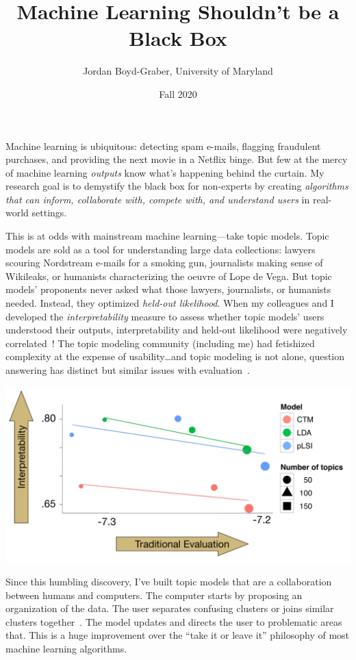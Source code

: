 \documentclass[11pt]{amsart}
\begin{document}
 \title{Machine Learning Shouldn't be a Black Box}

 \author{Jordan Boyd-Graber, University of Maryland}


\date{Fall 2020}

\maketitle

Machine learning is ubiquitous: detecting spam e-mails, flagging fraudulent
purchases, and providing the next movie in a Netflix binge.  But few at
the mercy of machine learning \emph{outputs} know what's happening behind the
curtain.  My research goal is to demystify the black box for non-experts by
creating \emph{algorithms that can inform, collaborate with, compete with, and
  understand users} in real-world settings.

This is at odds with mainstream machine learning---take topic models.  Topic
models are sold as a tool for understanding large data collections: lawyers
scouring Nordstream e-mails for a smoking gun, journalists making sense of Wikileaks,
or humanists characterizing the oeuvre of Lope de Vega.  But topic models'
proponents never asked what those lawyers, journalists, or humanists
needed. Instead, they optimized \emph{held-out likelihood}. When my colleagues
and I developed the \emph{interpretability} measure to assess whether topic
models' users understood their outputs, interpretability and
held-out likelihood were negatively correlated~\cite{chang-09b}! The topic
modeling community (including me) had fetishized complexity at the expense of
usability\dots and topic modeling is not alone, question answering has distinct but similar issues with evaluation~\cite{boyd-graber-20}.

\begin{center}
\includegraphics[width=.5\linewidth]{images/prec_ll_4}
\end{center}

Since this humbling discovery, I've built topic models that are a collaboration
between humans and computers.  The computer starts by proposing an organization
of the data.  The user separates confusing clusters or joins
similar clusters together~\cite{hu-14:itm}.  The model updates and directs the user to
problematic areas that.  This is a huge improvement over the
``take it or leave it'' philosophy of most machine learning algorithms.
\end{document}
